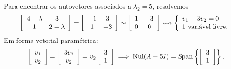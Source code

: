 \documentclass[../livro.tex]{subfiles}  %
\begin{document}
\begin{example}
	Para encontrar os autovetores associados a $\lambda_2 = 5$, resolvemos
	\begin{equation}
	\left[
	\begin{array}{cc}
	4-\lambda & 3 \\
	1 & 2-\lambda \\
	\end{array}
	\right] =
	\left[
	\begin{array}{cc}
	-1 & 3 \\
	1 & -3 \\
	\end{array}
	\right] \sim
	\left[
	\begin{array}{cc}
	1 & -3 \\
	0 &  0 \\
	\end{array}
	\right] \leftrightsquigarrow
	\left\{
	\begin{array}{ll}
	v_1 - 3 v_2 = 0 \\
	\hbox{1 variável livre.}
	\end{array}
	\right.
	\end{equation} Em forma vetorial paramétrica:
	\begin{equation}
	\left[
	\begin{array}{c}
	v_1 \\
	v_2 \\
	\end{array}
	\right] =
	\left[
	\begin{array}{c}
	3v_2 \\
	v_2 \\
	\end{array}
	\right] = v_2
	\left[
	\begin{array}{c}
	3 \\
	1 \\
	\end{array}
	\right] \implies \operatorname{Nul} (A - 5 I) = \operatorname{Span} \left\{ \left[
	\begin{array}{c}
	3 \\
	1 \\
	\end{array}
	\right] \right\}.
	\end{equation}
\end{example}
\end{document}
